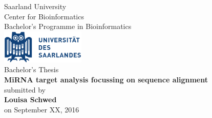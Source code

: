 \documentclass[12pt]{article}
\begin{document}
\def\supervisorIname{Advisor I}
\def\supervisorIIname{Second Reviewer}

	\def\university{Universit\"{a}t des Saarlandes}
	\def\institute{Center for Bioinformatics}
	\def\projectname{MiRNA target analysis focussing on sequence alignment}
	\vspace{.2em}  
	\def\author{Louisa Schwed}
	\def\date{September 2016}

\begin{titlepage}

  \begin{minipage}{\textwidth}
    \begin{center}
    { \large Saarland University \\ Center for Bioinformatics \\ Bachelor's Programme in Bioinformatics\\}
	\vspace{0.5cm}
    \includegraphics[width=4cm]{Logo-Universitaet_des_Saarlandes.pdf}\\
    \vspace{0.5cm}
    { \large Bachelor's Thesis\\}
    \vspace{0.5cm}
    {\huge\textbf{\projectname}}\\
    \vspace{0.5cm}
    { \large submitted by}\\
	\vspace{0.5cm}
    {\large\textbf{\author}}\\
    \vspace{0.5cm}
    {\large on September XX, 2016}\\
    \vspace{0.5cm}
    \end{center}
  \end{minipage}
  \newpage


\end{titlepage}
\end{document}
